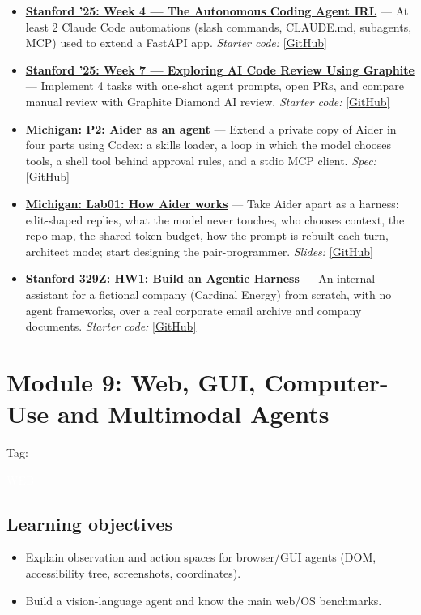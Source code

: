 \documentclass[10pt,oneside]{report}
\newcommand{\tg}[1]{{\setlength{\fboxsep}{1.2pt}\colorbox{tag#1}{\kern1pt\textcolor{white}{\sffamily\bfseries\fontsize{5.5}{6}\selectfont\strut #1}\kern1.5pt}}}
\begin{document}
\begin{itemize}
\item \hyperlink{asg-STAN25-4}{\textbf{Stanford '25: Week 4 --- The Autonomous Coding Agent IRL}} --- At least 2 Claude Code automations (slash commands, CLAUDE.md, subagents, MCP) used to extend a FastAPI app. \textit{Starter code:} \href{https://github.com/mihail911/modern-software-dev-assignments/tree/fall2025/week4}{[GitHub]}
\item \hyperlink{asg-STAN25-7}{\textbf{Stanford '25: Week 7 --- Exploring AI Code Review Using Graphite}} --- Implement 4 tasks with one-shot agent prompts, open PRs, and compare manual review with Graphite Diamond AI review. \textit{Starter code:} \href{https://github.com/mihail911/modern-software-dev-assignments/tree/fall2025/week7}{[GitHub]}
\item \hyperlink{asg-UMICH-4}{\textbf{Michigan: P2: Aider as an agent}} --- Extend a private copy of Aider in four parts using Codex: a skills loader, a loop in which the model chooses tools, a shell tool behind approval rules, and a stdio MCP client. \textit{Spec:} \href{https://github.com/eecs498-aase/materials/tree/main/egm}{[GitHub]}
\item \hyperlink{asg-UMICH-8}{\textbf{Michigan: Lab01: How Aider works}} --- Take Aider apart as a harness: edit-shaped replies, what the model never touches, who chooses context, the repo map, the shared token budget, how the prompt is rebuilt each turn, architect mode; start designing the pair-programmer. \textit{Slides:} \href{https://github.com/eecs498-aase/materials/blob/main/labs/Lab01/slides.pdf}{[GitHub]}
\item \hyperlink{asg-S329Z-1}{\textbf{Stanford 329Z: HW1: Build an Agentic Harness}} --- An internal assistant for a fictional company (Cardinal Energy) from scratch, with no agent frameworks, over a real corporate email archive and company documents. \textit{Starter code:} \href{https://github.com/cs329z/assignment1-harness}{[GitHub]}
\end{itemize}
\chapter{Module 9: Web, GUI, Computer-Use and Multimodal Agents}\hypertarget{mod-WEB}{}
{\small Tag: \tg{WEB}}
\section{Learning objectives}
\begin{itemize}
\item Explain observation and action spaces for browser/GUI agents (DOM, accessibility tree, screenshots, coordinates).
\item Build a vision-language agent and know the main web/OS benchmarks.
\end{itemize}
\end{document}
